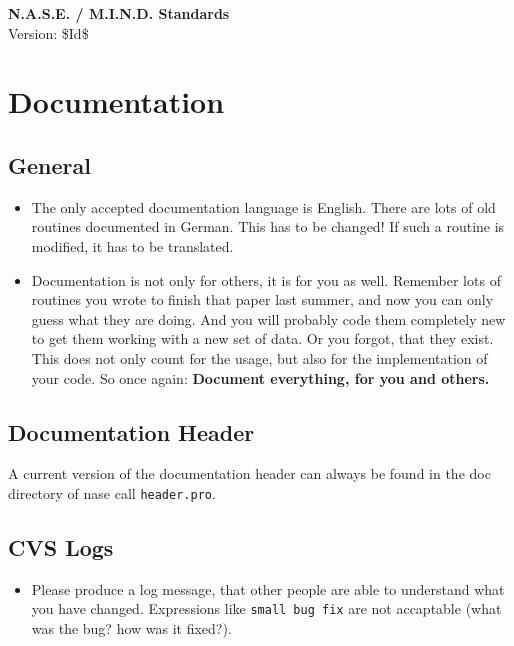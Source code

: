 \documentclass[12pt]{article}
\begin{document}
\begin{titlepage}
\begin{center}
{\Huge\textbf{N.A.S.E. / M.I.N.D. Standards}\\[2cm]}
Version: \$Id$ $\$ 
\end{center}
\vfill
\tableofcontents
\vfill
\vfill
\end{titlepage}

\section{Documentation}
\subsection{General}
\begin{itemize}
\item The only accepted documentation language is English. There are lots of old routines documented in German. This has to be changed! If such a routine is modified, it has to be translated. 
\item Documentation is not only for others, it is for you as well. Remember lots of routines you wrote to finish that paper last summer, and now you can only guess what they are doing. And you will probably code them completely new to get them working with a new set of data. Or you forgot, that they exist. This does not only count for the usage, but also for the implementation of your code. So once again: \textbf{Document everything, for you and others.}
\end{itemize}

\subsection{Documentation Header}
A current version of the documentation header can always be found in the doc directory of nase call \texttt{header.pro}.




\subsection{CVS Logs}
\begin{itemize}
\item Please produce a log message, that other people are able to understand what you have changed. Expressions like \texttt{small bug fix} are not accaptable (what was the bug? how was it fixed?).  
\end{itemize}
\end{document}
